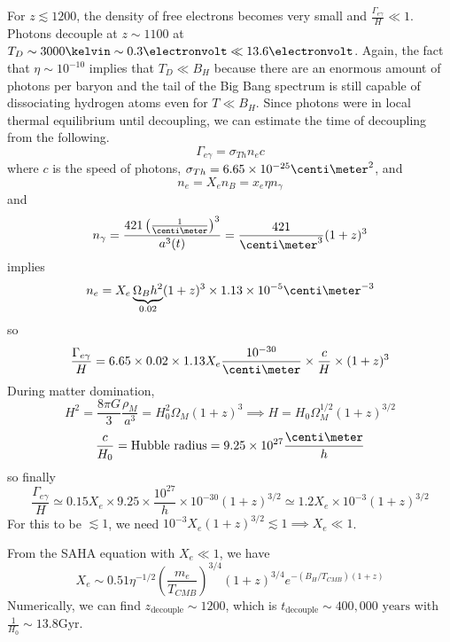\documentclass[a4paper,twoside,master.tex]{subfiles}
\begin{document}
For $ z \lesssim 1200 $, the density of free electrons becomes very small and $ \frac{\Gamma_{e \gamma}}{H} \ll 1 $. Photons decouple at $ z \sim 1100 $ at $ T_D \sim 3000\kelvin \sim 0.3 \electronvolt \ll 13.6 \electronvolt $. Again, the fact that $ \eta \sim 10^{-10} $ implies that $ T_D \ll B_H $ because there are an enormous amount of photons per baryon and the tail of the Big Bang spectrum is still capable of dissociating hydrogen atoms even for $ T \ll B_H $. Since photons were in local thermal equilibrium until decoupling, we can estimate the time of decoupling from the following.
\begin{equation}
    \Gamma_{e \gamma} = \sigma_{Th} n_e c
\end{equation}
where $ c $ is the speed of photons, $ \sigma_{Th} = 6.65 \times 10^{-25} \centi\meter^2 $, and
\begin{equation}
    n_e = X_e n_B = x_e \eta n_{\gamma} 
\end{equation}
and
\begin{equation}
    n_{\gamma} = \frac{421 \left( \frac{1}{\centi\meter} \right)^3}{a^3(t)} = \frac{421}{\centi\meter^3} (1 + z)^3
\end{equation}
implies
\begin{equation}
    n_e = X_e \underbrace{\Omega_B h^2}_{0.02} (1 + z)^3 \times 1.13 \times 10^{-5} \centi\meter^{-3}
\end{equation}
so
\begin{equation}
    \frac{\Gamma_{e \gamma}}{H} = 6.65 \times 0.02 \times 1.13 X_e \frac{10^{-30}}{\centi\meter} \times \frac{c}{H} \times (1 + z)^3
\end{equation}
During matter domination,
\begin{equation}
    H^2 = \frac{8 \pi G}{3} \frac{\rho_M}{a^3} = H_0^2 \Omega_M (1 + z)^3 \implies H = H_0 \Omega_M^{1/2} (1 + z)^{3/2}
\end{equation}
\begin{equation}
    \frac{c}{H_0} = \text{Hubble radius} = 9.25 \times 10^{27} \frac{\centi\meter}{h}
\end{equation}
so finally
\begin{equation}
    \frac{\Gamma_{e \gamma}}{H} \simeq 0.15 X_e \times 9.25 \times \frac{10^{27}}{h} \times 10^{-30} (1 + z)^{3/2} \simeq 1.2 X_e \times 10^{-3} (1 + z)^{3/2}
\end{equation}
For this to be $ \lesssim 1 $, we need $ 10^{-3} X_e (1+z)^{3/2} \lesssim 1 \implies X_e \ll 1 $.

From the SAHA equation with $ X_e \ll 1 $, we have
\begin{equation}
    X_e \sim 0.51 \eta^{-1/2} \left( \frac{m_e}{T_{CMB}} \right)^{3/4} (1 + z)^{3/4} e^{- (B_H / T_{CMB}) (1 + z)}
\end{equation}
Numerically, we can find $ z_{\text{decouple}} \sim 1200 $, which is $ t_{\text{decouple}} \sim 400,000\text{ years} $ with $ \frac{1}{H_0} \sim 13.8 \text{Gyr} $.
\end{document}
